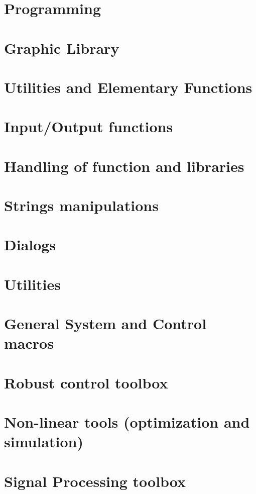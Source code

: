 \documentclass[11pt]{book}
\begin{document}


\chapter{Programming}
         
\chapter{Graphic Library }
         
\chapter{Utilities and Elementary Functions}
         
\chapter{Input/Output functions}
         
\chapter{Handling of function and libraries}
        
\chapter{Strings manipulations}
        
\chapter{Dialogs}
        
\chapter{Utilities}
        
\chapter{General System and Control macros}
         
\chapter{Robust control toolbox}
         
\chapter{Non-linear tools (optimization and simulation) }
        
\chapter{Signal Processing toolbox}
        
        
\end{document}
